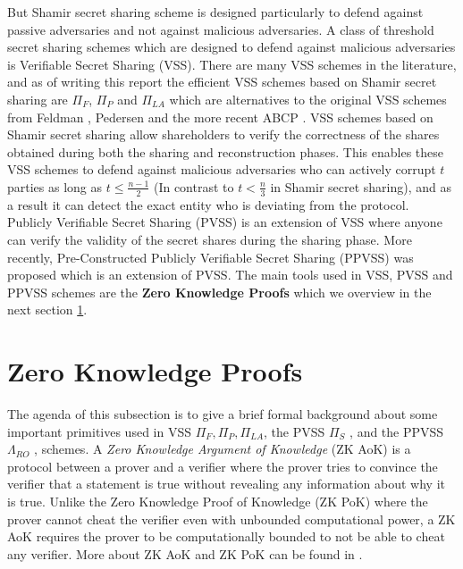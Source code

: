 But Shamir secret sharing scheme is designed particularly to defend against passive adversaries and not 
against malicious adversaries. A class of threshold secret sharing schemes which are designed to defend 
against malicious adversaries is Verifiable Secret Sharing (VSS). There are many VSS schemes in the literature, 
and as of writing this report the efficient VSS schemes based on Shamir secret sharing are $\Pi_F$, 
$\Pi_P$ and $\Pi_{LA}$ \cite{cryptoeprint:2023/1669} which are alternatives to the original VSS schemes 
from Feldman \cite{DBLP:conf/focs/Feldman87}, Pedersen \cite{crypto-1991-1671} and the more recent 
ABCP \cite{cryptoeprint:2023/992}. VSS schemes based on Shamir secret sharing allow shareholders to 
verify the correctness of the shares obtained during both the sharing and reconstruction phases. This enables 
these VSS schemes to defend against malicious adversaries who can actively corrupt $t$ parties as long as 
$t\leq\frac{n-1}{2}$ (In contrast to $t<\frac{n}{3}$ in Shamir secret sharing), and as a 
result it can detect the exact entity who is deviating from the protocol. Publicly Verifiable Secret Sharing (PVSS) is an extension of VSS where anyone can 
verify the validity of the secret shares during the sharing phase. More recently, Pre-Constructed Publicly 
Verifiable Secret Sharing (PPVSS)\cite{cryptoeprint:2025/576} was proposed which is an extension of PVSS. 
The main tools used in VSS, PVSS and PPVSS schemes are the \textbf{Zero Knowledge Proofs} which we overview in the 
next section \ref{sec:sigma-protocols}.

\section{Zero Knowledge Proofs}
\label{sec:sigma-protocols}
The agenda of this subsection is to give a brief formal background about some important primitives 
used in VSS $\Pi_{F},\Pi_{P},\Pi_{LA}$, the PVSS $\Pi_S$ \cite{cryptoeprint:2023/1669}, and the PPVSS $\Lambda_{RO}$ \cite{cryptoeprint:2025/576}, schemes. 
A \textit{Zero Knowledge Argument of Knowledge} (ZK AoK) is a protocol between a prover and a verifier
where the prover tries to convince the verifier that a statement is true without revealing any information 
about why it is true. Unlike the Zero Knowledge Proof of Knowledge (ZK PoK) where the prover cannot cheat 
the verifier even with unbounded computational power, a ZK AoK requires the prover to be computationally bounded 
to not be able to cheat any verifier. More about ZK AoK and ZK PoK can be found in \cite{cryptoeprint:2017/1066}.\par

